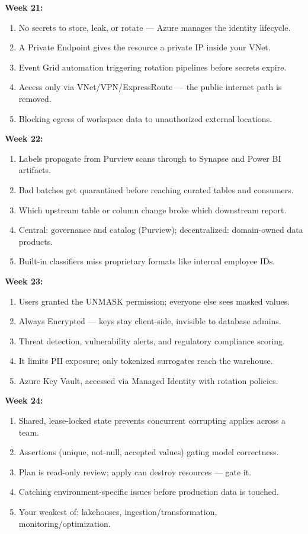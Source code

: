\documentclass[11pt, a4paper]{article}
\begin{document}
\noindent\textbf{Week 21:}
\begin{enumerate}[itemsep=0pt]
    \item No secrets to store, leak, or rotate --- Azure manages the identity lifecycle.
    \item A Private Endpoint gives the resource a private IP inside your VNet.
    \item Event Grid automation triggering rotation pipelines before secrets expire.
    \item Access only via VNet/VPN/ExpressRoute --- the public internet path is removed.
    \item Blocking egress of workspace data to unauthorized external locations.
\end{enumerate}
\noindent\textbf{Week 22:}
\begin{enumerate}[itemsep=0pt]
    \item Labels propagate from Purview scans through to Synapse and Power BI artifacts.
    \item Bad batches get quarantined before reaching curated tables and consumers.
    \item Which upstream table or column change broke which downstream report.
    \item Central: governance and catalog (Purview); decentralized: domain-owned data products.
    \item Built-in classifiers miss proprietary formats like internal employee IDs.
\end{enumerate}
\noindent\textbf{Week 23:}
\begin{enumerate}[itemsep=0pt]
    \item Users granted the UNMASK permission; everyone else sees masked values.
    \item Always Encrypted --- keys stay client-side, invisible to database admins.
    \item Threat detection, vulnerability alerts, and regulatory compliance scoring.
    \item It limits PII exposure; only tokenized surrogates reach the warehouse.
    \item Azure Key Vault, accessed via Managed Identity with rotation policies.
\end{enumerate}
\noindent\textbf{Week 24:}
\begin{enumerate}[itemsep=0pt]
    \item Shared, lease-locked state prevents concurrent corrupting applies across a team.
    \item Assertions (unique, not-null, accepted values) gating model correctness.
    \item Plan is read-only review; apply can destroy resources --- gate it.
    \item Catching environment-specific issues before production data is touched.
    \item Your weakest of: lakehouses, ingestion/transformation, monitoring/optimization.
\end{enumerate}
\end{document}

